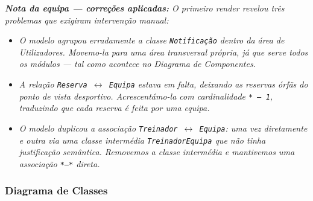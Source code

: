 \noindent\textit{\textbf{Nota da equipa --- correções aplicadas:} O primeiro \textit{render} revelou três problemas que exigiram intervenção manual:}
\begin{itemize}
    \item \textit{O modelo agrupou erradamente a classe \texttt{Notificação} dentro da área de Utilizadores. Movemo-la para uma área transversal própria, já que serve todos os módulos --- tal como acontece no Diagrama de Componentes.}
    \item \textit{A relação \texttt{Reserva $\leftrightarrow$ Equipa} estava em falta, deixando as reservas órfãs do ponto de vista desportivo. Acrescentámo-la com cardinalidade \texttt{* -- 1}, traduzindo que cada reserva é feita por uma equipa.}
    \item \textit{O modelo duplicou a associação \texttt{Treinador $\leftrightarrow$ Equipa}: uma vez diretamente e outra via uma classe intermédia \texttt{TreinadorEquipa} que não tinha justificação semântica. Removemos a classe intermédia e mantivemos uma associação \texttt{*--*} direta.}
\end{itemize}

\subsubsection*{Diagrama de Classes}


